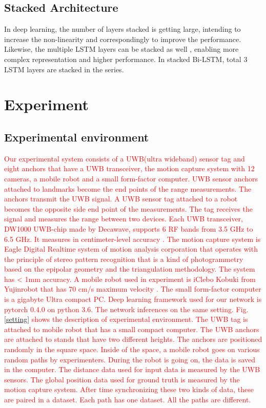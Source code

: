 \documentclass[letterpaper, 10 pt, conference]{ieeeconf}  %
\begin{document}
\subsection{Stacked Architecture}

In deep learning, the number of layers stacked is getting large, intending to increase the non-linearity and correspondingly to improve the performance. Likewise, the multiple LSTM layers can be stacked as well \cite{dyer2015transition}, enabling more complex representation and higher performance. In stacked Bi-LSTM, total 3 LSTM layers are stacked in the series. 


\section{Experiment}


\subsection{Experimental environment} 

 \textcolor{red}{Our experimental system consists of a UWB(ultra wideband) sensor tag and eight anchors that have a UWB transceiver, the motion capture system with 12 cameras, a mobile robot and a small form-factor computer. UWB sensor anchors attached to landmarks become the end points of the range measurements. The anchors transmit the UWB signal. A UWB sensor tag attached to a robot becomes the opposite side end point of the measurements. The tag receives the signal and measures the range between two devices. Each UWB transceiver, DW1000 UWB-chip made by Decawave, supports 6 RF bands from 3.5 GHz to 6.5 GHz. It measures in centimeter-level accuracy . The motion capture system is Eagle Digital Realtime system of motion analysis corporation that operates with the principle of stereo pattern recognition that is a kind of photogrammetry based on the epipolar geometry and the triangulation methodology. The system has < 1mm accuracy. A mobile robot used in experiment is iClebo Kobuki from Yujinrobot that has 70 cm/s maximum velocity . The small form-factor computer is a gigabyte Ultra compact PC. Deep learning framework used for our network is pytorch 0.4.0 on python 3.6. The network inferences on the same setting.
 Fig. \ref{setting} shows the description of experimental environment. The UWB tag is attached to mobile robot that has a small compact computer. The UWB anchors are attached to stands that have two different heights. The anchors are positioned randomly in the square space. Inside of the space, a mobile robot goes on various random paths by experimenters. During the robot is going on, the data is saved in the computer. The distance data used for input data is measured by the UWB sensors. The global position data used for ground truth is measured by the motion capture system. After time synchronizing these two kinds of data, these are paired in a dataset. Each path has one dataset. All the paths are different.}
\end{document}
